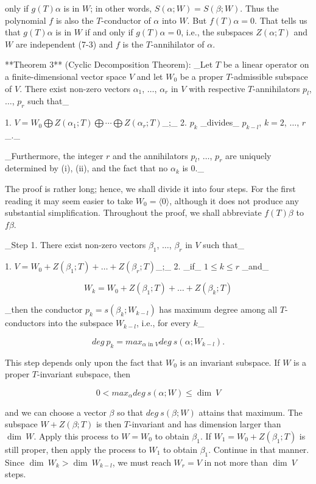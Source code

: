 only if \(g(T)\alpha\) is in \(W\); in other words, \(S(\alpha;W)=S(\beta;W)\). Thus the polynomial \(f\) is also the \(T\)-conductor of \(\alpha\) into \(W\). But \(f(T)\alpha=0\). That tells us that \(g(T)\alpha\) is in \(W\) if and only if \(g(T)\alpha=0\), i.e., the subspaces \(Z(\alpha;T)\) and \(W\) are independent (7-3) and \(f\) is the \(T\)-annihilator of \(\alpha\).

**Theorem 3** (Cyclic Decomposition Theorem): _Let \(T\) be a linear operator on a finite-dimensional vector space \(V\) and let \(W_{0}\) be a proper \(T\)-admissible subspace of \(V\). There exist non-zero vectors \(\alpha_{1}\), \(\ldots\), \(\alpha_{r}\) in \(V\) with respective \(T\)-annihilators \(p_{l}\), \(\ldots\), \(p_{r}\) such that_

1. \(V=W_{0}\bigoplus Z(\alpha_{1};T)\bigoplus\cdots\bigoplus Z(\alpha_{r};T)\)_;_
2. \(p_{k}\) _divides_ \(p_{k-l}\), \(k=2\), \(\ldots\), \(r\)_._

_Furthermore, the integer \(r\) and the annihilators \(p_{l}\), \(\ldots\), \(p_{r}\) are uniquely determined by (i), (ii), and the fact that no \(\alpha_{k}\) is \(0\)._

The proof is rather long; hence, we shall divide it into four steps. For the first reading it may seem easier to take \(W_{0}=\langle 0\rangle\), although it does not produce any substantial simplification. Throughout the proof, we shall abbreviate \(f(T)\beta\) to \(f\beta\).

_Step 1. There exist non-zero vectors \(\beta_{1}\), \(\ldots\), \(\beta_{r}\) in \(V\) such that_

1. \(V=W_{0}+Z(\beta_{1};T)+\ldots+Z(\beta_{r};T)\)_;_
2. _if_ \(1\leq k\leq r\) _and_

\[W_{k}=W_{0}+Z(\beta_{1};T)+\ldots+Z(\beta_{k};T)\]

_then the conductor \(p_{k}=s(\beta_{k};W_{k-l})\) has maximum degree among all \(T\)-conductors into the subspace \(W_{k-l}\), i.e., for every \(k\)_

\[deg\ p_{k}=max_{\alpha\text{ in }V}deg\ s(\alpha;W_{k-l}).\]

This step depends only upon the fact that \(W_{0}\) is an invariant subspace. If \(W\) is a proper \(T\)-invariant subspace, then

\[0<max_{\alpha}deg\ s(\alpha;W)\leq\dim\ V\]

and we can choose a vector \(\beta\) so that \(deg\ s(\beta;W)\) attains that maximum. The subspace \(W+Z(\beta;T)\) is then \(T\)-invariant and has dimension larger than \(\dim\ W\). Apply this process to \(W=W_{0}\) to obtain \(\beta_{1}\). If \(W_{1}=W_{0}+Z(\beta_{1};T)\) is still proper, then apply the process to \(W_{1}\) to obtain \(\beta_{1}\). Continue in that manner. Since \(\dim\ W_{k}>\dim\ W_{k-l}\), we must reach \(W_{r}=V\) in not more than \(\dim\ V\) steps.


